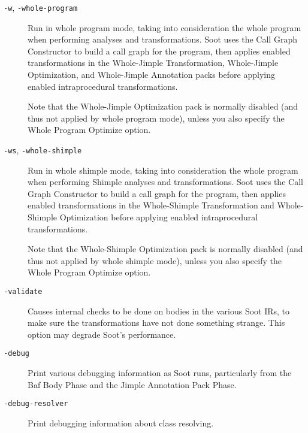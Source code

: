 \documentclass{article}
\begin{document}
\begin{description}
  \item[
  {\tt -w}, 
  {\tt -whole-program}]


\par

Run in whole program mode, taking into consideration the whole
program when performing analyses and transformations. Soot
uses the Call Graph Constructor to build a call graph for the
program, then applies enabled transformations in the Whole-Jimple
Transformation, Whole-Jimple Optimization, and Whole-Jimple
Annotation packs before applying enabled intraprocedural
transformations.

\par

Note that the Whole-Jimple Optimization pack is normally disabled
(and thus not applied by whole program mode), unless you also
specify the Whole Program Optimize option.



  \item[
  {\tt -ws}, 
  {\tt -whole-shimple}]


\par

Run in whole shimple mode, taking into consideration the whole program
when performing Shimple analyses and transformations. Soot uses the
Call Graph Constructor to build a call graph for the program, then
applies enabled transformations in the Whole-Shimple Transformation
and Whole-Shimple Optimization before applying enabled intraprocedural
transformations.

\par

Note that the Whole-Shimple Optimization pack is normally disabled
(and thus not applied by whole shimple mode), unless you also
specify the Whole Program Optimize option.
      


  \item[
  {\tt -validate}]

Causes internal checks to be done on bodies in the various Soot IRs,
to make sure the transformations have not done something strange.
This option may degrade Soot's performance.



  \item[
  {\tt -debug}]

Print various debugging information as Soot runs, particularly
from the Baf Body Phase and the Jimple Annotation Pack Phase.



  \item[
  {\tt -debug-resolver}]

Print debugging information about class resolving.



\end{description}
\end{document}
